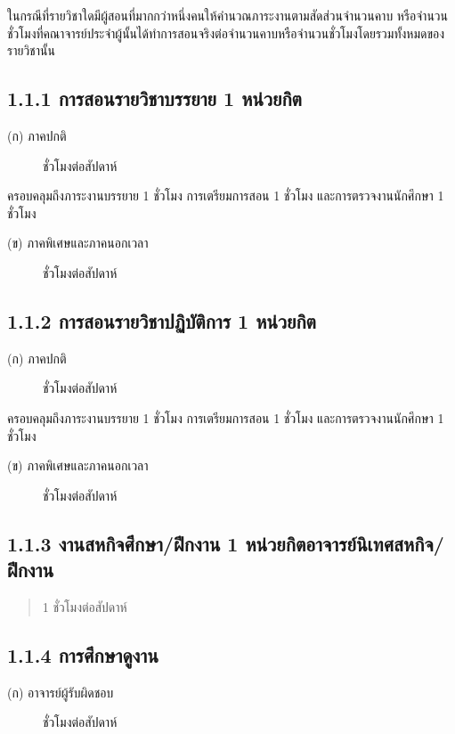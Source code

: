 \documentclass[a4paper,12pt,english]{sphinxmanual}
\begin{document}
ในกรณีที่รายวิชาใดมีผู้สอนที่มากกว่าหนึ่งคนให้คำนวณภาระงานตามสัดส่วนจำนวนคาบ หรือจำนวนชั่วโมงที่คณาจารย์ประจำผู้นั้นได้ทำการสอนจริงต่อจำนวนคาบหรือจำนวนชั่วโมงโดยรวมทั้งหมดของรายวิชานั้น


\subsection{1.1.1 การสอนรายวิชาบรรยาย 1 หน่วยกิต}
\label{\detokenize{1teaching:id4}}\begin{description}
\item[{(ก) ภาคปกติ}]  ชั่วโมงต่อสัปดาห์

\end{description}

ครอบคลุมถึงภาระงานบรรยาย 1 ชั่วโมง การเตรียมการสอน 1 ชั่วโมง และการตรวจงานนักศึกษา 1 ชั่วโมง
\begin{description}
\item[{(ข) ภาคพิเศษและภาคนอกเวลา}]  ชั่วโมงต่อสัปดาห์

\end{description}


\subsection{1.1.2 การสอนรายวิชาปฏิบัติการ 1 หน่วยกิต}
\label{\detokenize{1teaching:id5}}\begin{description}
\item[{(ก) ภาคปกติ}]  ชั่วโมงต่อสัปดาห์

\end{description}

ครอบคลุมถึงภาระงานบรรยาย 1 ชั่วโมง การเตรียมการสอน 1 ชั่วโมง และการตรวจงานนักศึกษา 1 ชั่วโมง
\begin{description}
\item[{(ข) ภาคพิเศษและภาคนอกเวลา}]  ชั่วโมงต่อสัปดาห์

\end{description}


\subsection{1.1.3 งานสหกิจศึกษา/ฝึกงาน 1 หน่วยกิตอาจารย์นิเทศสหกิจ/ฝึกงาน}
\label{\detokenize{1teaching:id6}}\begin{quote}

1 ชั่วโมงต่อสัปดาห์
\end{quote}


\subsection{1.1.4 การศึกษาดูงาน}
\label{\detokenize{1teaching:id7}}\begin{description}
\item[{(ก) อาจารย์ผู้รับผิดชอบ}]  ชั่วโมงต่อสัปดาห์

\end{description}
\end{document}
